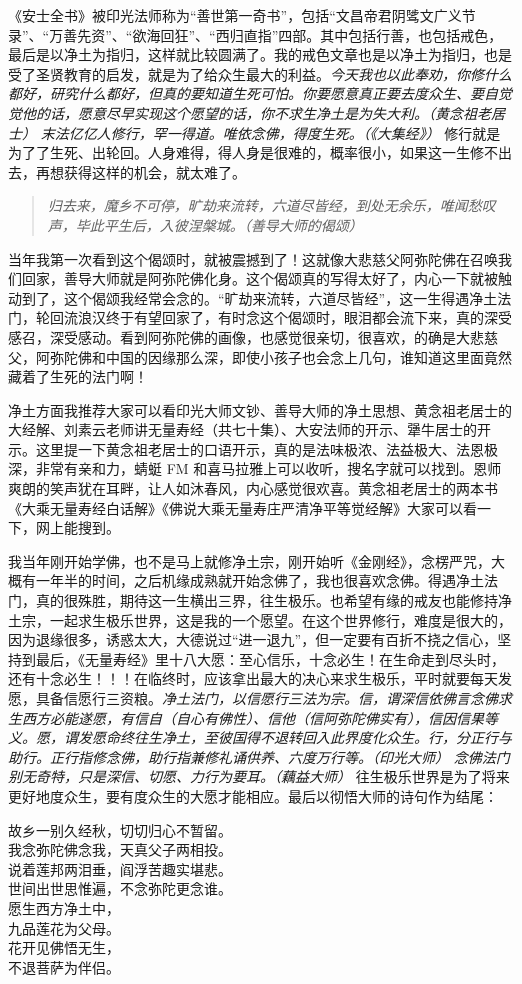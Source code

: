 《安士全书》被印光法师称为“善世第一奇书”，包括“文昌帝君阴骘文广义节录”、“万善先资”、“欲海回狂”、“西归直指”四部。其中包括行善，也包括戒色，最后是以净土为指归，这样就比较圆满了。我的戒色文章也是以净土为指归，也是受了圣贤教育的启发，就是为了给众生最大的利益。\textit{今天我也以此奉劝，你修什么都好，研究什么都好，但真的要知道生死可怕。你要愿意真正要去度众生、要自觉觉他的话，愿意尽早实现这个愿望的话，你不求生净土是为失大利。（黄念祖老居士）} \textit{末法亿亿人修行，罕一得道。唯依念佛，得度生死。（《大集经》）} 修行就是为了了生死、出轮回。人身难得，得人身是很难的，概率很小，如果这一生修不出去，再想获得这样的机会，就太难了。

\begin{quote}\it
    归去来，魔乡不可停，旷劫来流转，六道尽皆经，到处无余乐，唯闻愁叹声，毕此平生后，入彼涅槃城。（善导大师的偈颂）
\end{quote}

当年我第一次看到这个偈颂时，就被震撼到了！这就像大悲慈父阿弥陀佛在召唤我们回家，善导大师就是阿弥陀佛化身。这个偈颂真的写得太好了，内心一下就被触动到了，这个偈颂我经常会念的。“旷劫来流转，六道尽皆经”，这一生得遇净土法门，轮回流浪汉终于有望回家了，有时念这个偈颂时，眼泪都会流下来，真的深受感召，深受感动。看到阿弥陀佛的画像，也感觉很亲切，很喜欢，的确是大悲慈父，阿弥陀佛和中国的因缘那么深，即使小孩子也会念上几句，谁知道这里面竟然藏着了生死的法门啊！

净土方面我推荐大家可以看印光大师文钞、善导大师的净土思想、黄念祖老居士的大经解、刘素云老师讲无量寿经（共七十集）、大安法师的开示、犟牛居士的开示。这里提一下黄念祖老居士的口语开示，真的是法味极浓、法益极大、法恩极深，非常有亲和力，蜻蜓 FM 和喜马拉雅上可以收听，搜名字就可以找到。恩师爽朗的笑声犹在耳畔，让人如沐春风，内心感觉很欢喜。黄念祖老居士的两本书《大乘无量寿经白话解》《佛说大乘无量寿庄严清净平等觉经解》大家可以看一下，网上能搜到。

我当年刚开始学佛，也不是马上就修净土宗，刚开始听《金刚经》，念楞严咒，大概有一年半的时间，之后机缘成熟就开始念佛了，我也很喜欢念佛。得遇净土法门，真的很殊胜，期待这一生横出三界，往生极乐。也希望有缘的戒友也能修持净土宗，一起求生极乐世界，这是我的一个愿望。在这个世界修行，难度是很大的，因为退缘很多，诱惑太大，大德说过“进一退九”，但一定要有百折不挠之信心，坚持到最后，《无量寿经》里十八大愿：至心信乐，十念必生！在生命走到尽头时，还有十念必生！！！在临终时，应该拿出最大的决心来求生极乐，平时就要每天发愿，具备信愿行三资粮。\textit{净土法门，以信愿行三法为宗。信，谓深信依佛言念佛求生西方必能遂愿，有信自（自心有佛性）、信他（信阿弥陀佛实有），信因信果等义。愿，谓发愿命终往生净土，至彼国得不退转回入此界度化众生。行，分正行与助行。正行指修念佛，助行指兼修礼诵供养、六度万行等。（印光大师）} \textit{念佛法门别无奇特，只是深信、切愿、力行为要耳。（藕益大师）} 往生极乐世界是为了将来更好地度众生，要有度众生的大愿才能相应。最后以彻悟大师的诗句作为结尾：

\begin{multicols}{2}
    \begin{center}
        故乡一别久经秋，切切归心不暂留。 \\ 我念弥陀佛念我，天真父子两相投。 \\ 说着莲邦两泪垂，阎浮苦趣实堪悲。 \\ 世间出世思惟遍，不念弥陀更念谁。 \\ 愿生西方净土中， \\ 九品莲花为父母。 \\ 花开见佛悟无生， \\ 不退菩萨为伴侣。
    \end{center}
\end{multicols}
